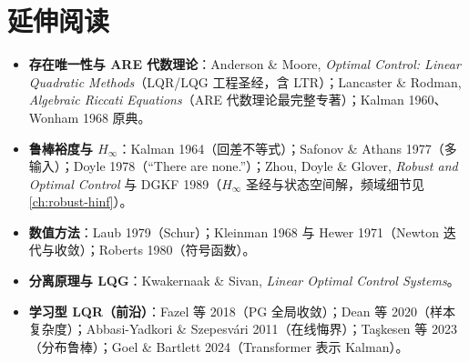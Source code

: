 \section*{延伸阅读}

\begin{itemize}
  \item \textbf{存在唯一性与 ARE 代数理论}：Anderson \& Moore, \emph{Optimal Control: Linear Quadratic Methods}\cite{anderson2007optimal}（LQR/LQG 工程圣经，含 LTR）；Lancaster \& Rodman, \emph{Algebraic Riccati Equations}\cite{lancaster1995algebraic}（ARE 代数理论最完整专著）；Kalman 1960\cite{kalman1960}、Wonham 1968\cite{wonham1968riccati} 原典。
  \item \textbf{鲁棒裕度与 $H_\infty$}：Kalman 1964\cite{kalman1964optimal}（回差不等式）；Safonov \& Athans 1977\cite{safonov1977gain}（多输入）；Doyle 1978\cite{doyle1978guaranteed}（“There are none.”）；Zhou, Doyle \& Glover, \emph{Robust and Optimal Control}\cite{zhou1996robust} 与 DGKF 1989\cite{doyle1989dgkf}（$H_\infty$ 圣经与状态空间解，频域细节见 \cref{ch:robust-hinf}）。
  \item \textbf{数值方法}：Laub 1979\cite{laub1979schur}（Schur）；Kleinman 1968\cite{kleinman1968iterative} 与 Hewer 1971\cite{hewer1971iterative}（Newton 迭代与收敛）；Roberts 1980\cite{roberts1980linear}（符号函数）。
  \item \textbf{分离原理与 LQG}：Kwakernaak \& Sivan, \emph{Linear Optimal Control Systems}\cite{kwakernaak1972linear}。
  \item \textbf{学习型 LQR（前沿）}：Fazel 等 2018\cite{fazel2018global}（PG 全局收敛）；Dean 等 2020\cite{dean2020sample}（样本复杂度）；Abbasi-Yadkori \& Szepesvári 2011\cite{abbasiyadkori2011regret}（在线悔界）；Taşkesen 等 2023\cite{taskesen2023distributionally}（分布鲁棒）；Goel \& Bartlett 2024\cite{goel2024transformer}（Transformer 表示 Kalman）。
\end{itemize}
